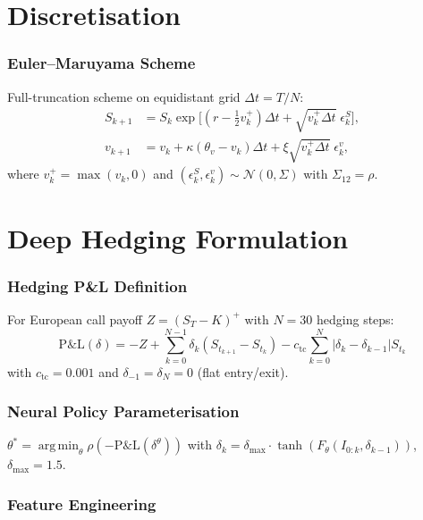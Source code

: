 \documentclass[11pt,oneside]{report}
\newcommand{\argmin}{\mathop{\mathrm{arg\,min}}}
\begin{document}
\section{Discretisation}

\subsubsection{Euler--Maruyama Scheme}

Full-truncation scheme on equidistant grid $\Delta t = T/N$:
\begin{align}
    S_{k+1} &= S_k \exp\!\bigl[(r - \tfrac{1}{2}v_k^+)\Delta t + \sqrt{v_k^+\Delta t}\;\epsilon_k^S\bigr], \\
    v_{k+1} &= v_k + \kappa(\theta_v - v_k)\Delta t + \xi\sqrt{v_k^+\Delta t}\;\epsilon_k^v,
\end{align}
where $v_k^+ = \max(v_k, 0)$ and $(\epsilon_k^S, \epsilon_k^v) \sim \mathcal{N}(0, \Sigma)$ with $\Sigma_{12} = \rho$.

\section{Deep Hedging Formulation}

\subsubsection{Hedging P\&L Definition}

For European call payoff $Z = (S_T - K)^+$ with $N = 30$ hedging steps:
\begin{equation}
    \mathrm{P\&L}(\delta) = -Z + \sum_{k=0}^{N-1} \delta_k (S_{t_{k+1}} - S_{t_k}) - c_{\mathrm{tc}} \sum_{k=0}^{N} |\delta_k - \delta_{k-1}| S_{t_k}
    \label{eq:pnl}
\end{equation}
with $c_{\mathrm{tc}} = 0.001$ and $\delta_{-1} = \delta_N = 0$ (flat entry/exit).

\subsubsection{Neural Policy Parameterisation}

$\theta^* = \argmin_\theta \rho(-\mathrm{P\&L}(\delta^\theta))$ with $\delta_k = \delta_{\max} \cdot \tanh(F_\theta(I_{0:k}, \delta_{k-1}))$, $\delta_{\max} = 1.5$.

\subsubsection{Feature Engineering}
\end{document}
